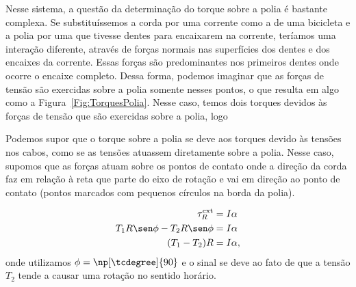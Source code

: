Nesse sistema, a questão da determinação do torque sobre a polia é bastante complexa. Se substituíssemos a corda por uma corrente como a de uma bicicleta e a polia por uma que tivesse dentes para encaixarem na corrente, teríamos uma interação diferente, através de forças normais nas superfícies dos dentes e dos encaixes da corrente. Essas forças são predominantes nos primeiros dentes onde ocorre o encaixe completo. Dessa forma, podemos imaginar que as forças de tensão são exercidas sobre a polia somente nesses pontos, o que resulta em algo como a Figura~\eqref{Fig:TorquesPolia}. Nesse caso, temos dois torques devidos às forças de tensão que são exercidas sobre a polia, logo
%
\begin{marginfigure}[5cm]
\centering
{}
\caption{Podemos supor que o torque sobre a polia se deve aos torques devido às tensões nos cabos, como se as tensões atuassem diretamente sobre a polia. Nesse caso, supomos que as forças atuam sobre os pontos de contato onde a direção da corda faz  em relação à reta que parte do eixo de rotação e vai em direção ao ponto de contato (pontos marcados com pequenos círculos na borda da polia).\label{Fig:TorquesPolia}}
\end{marginfigure}
%
\begin{align}
    \tau_R^{\rm{ext}} &= I \alpha \\
    T_1 R \sen\phi - T_2 R \sen\phi &= I \alpha \\
    (T_1 - T_2) R &= I\alpha,
\end{align}
%
onde utilizamos $\phi = \np[\tcdegree]{90}$ e o sinal se deve ao fato de que a tensão $T_2$ tende a causar uma rotação no sentido horário.

